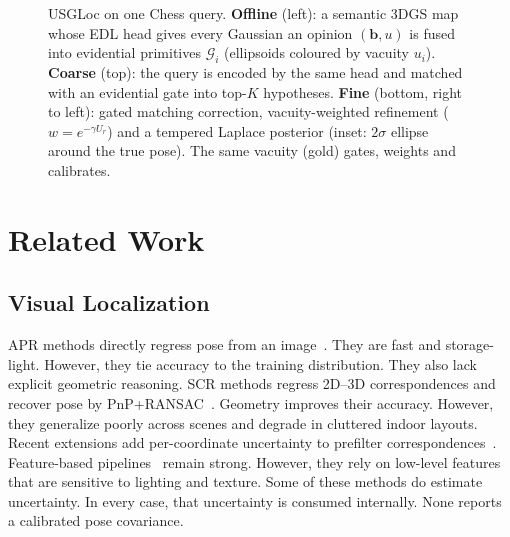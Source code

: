 \documentclass[journal]{IEEEtran}
\newcommand{\method}{USGLoc}
\begin{document}
\begin{figure}[t]
\centering
\resizebox{\textwidth}{!}{}
\caption{\method{} on one Chess query. \textbf{Offline} (left): a semantic 3DGS map whose EDL head gives every Gaussian an opinion $(\mathbf{b},u)$ is fused into evidential primitives $\mathcal{G}_i$ (ellipsoids coloured by vacuity $u_i$). \textbf{Coarse} (top): the query is encoded by the same head and matched with an evidential gate into top-$K$ hypotheses. \textbf{Fine} (bottom, right to left): gated matching correction, vacuity-weighted refinement ($w=e^{-\gamma U_r}$) and a tempered Laplace posterior (inset: $2\sigma$ ellipse around the true pose). The same vacuity (gold) gates, weights and calibrates.}
\label{fig:overview}
\end{figure}

\section{Related Work}

\subsection{Visual Localization}
APR methods directly regress pose from an image~\cite{posenet,marepo}. They are fast and storage-light. However, they tie accuracy to the training distribution. They also lack explicit geometric reasoning. SCR methods regress 2D--3D correspondences and recover pose by PnP+RANSAC~\cite{dsacstar,ace}. Geometry improves their accuracy. However, they generalize poorly across scenes and degrade in cluttered indoor layouts. Recent extensions add per-coordinate uncertainty to prefilter correspondences~\cite{bruns2025ace}. Feature-based pipelines~\cite{lightglue} remain strong. However, they rely on low-level features that are sensitive to lighting and texture. Some of these methods do estimate uncertainty. In every case, that uncertainty is consumed internally. None reports a calibrated pose covariance.
\end{document}
